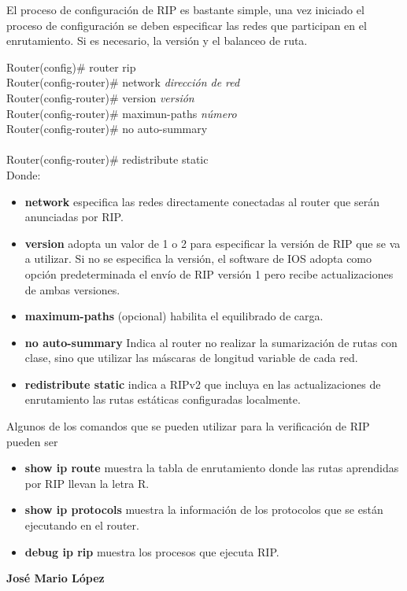 \documentclass[12pt]{article}
\begin{document}
El proceso de configuración de RIP es bastante simple, una vez iniciado el proceso de configuración se deben especificar las redes que participan en el enrutamiento. Si es necesario, la versión y el balanceo de ruta.\\\vspace{5px}

Router(config)\# router rip\\
Router(config-router)\# network \textit{dirección de red}\\
Router(config-router)\# version \textit{versión}\\
Router(config-router)\# maximun-paths \textit{número}\\
Router(config-router)\# no auto-summary\\\\
Router(config-router)\# redistribute static
\vspace{5px}
\\
Donde:
\begin{itemize}
\item \textbf{network} especifica las redes directamente conectadas al router que serán anunciadas por RIP.
\item \textbf{version} adopta un valor de 1 o 2 para especificar la versión de RIP que se va a utilizar. Si no se especifica la versión, el software de IOS adopta como opción predeterminada el envío de RIP versión 1 pero recibe actualizaciones de ambas versiones.
\item \textbf{maximum-paths} (opcional) habilita el equilibrado de carga.
\item \textbf{no auto-summary} Indica al router no realizar la sumarización de rutas con clase, sino que utilizar las máscaras de longitud variable de cada red.
\item \textbf{redistribute static} indica a RIPv2 que incluya en las actualizaciones de enrutamiento las rutas estáticas configuradas localmente.
\end{itemize}

Algunos de los comandos que se pueden utilizar para la verificación de RIP pueden ser
\begin{itemize}
\item \textbf{show ip route} muestra la tabla de enrutamiento donde las rutas aprendidas por RIP llevan la letra R.
\item \textbf{show ip protocols} muestra la información de los protocolos que se están ejecutando en el router.
\item \textbf{debug ip rip} muestra los procesos que ejecuta RIP.
\end{itemize}
\vfill
{\textbf {\normalsize José Mario López}}
\end{document}
